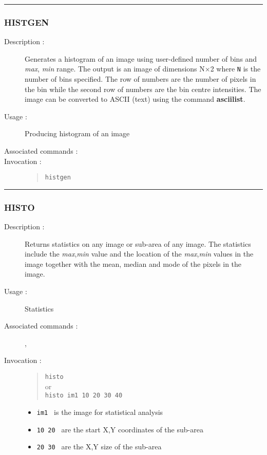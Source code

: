 \hrule 
\subsubsection*{\label{HISTGEN}HISTGEN}

\begin{description}

\item[Description :] Generates a histogram of an image using
user-defined number of bins and {\it max}, {\it min} range.  The output
is an image of dimensions N$\times$2 where {\tt N} is the number of bins
specified.  The row of numbers are the number of pixels in the bin
while the second row of numbers are the bin centre intensities.  The
image can be converted to ASCII (text) using the command {\bf asciilist}.

\item[Usage :] Producing histogram of an image
\item[Associated commands :] {\tt {}}
\item[Invocation :]

\begin{quote}{\tt  histgen }\end{quote}

\end{description}

\hrule 
\subsubsection*{\label{HISTO}HISTO}

\begin{description}

\item[Description :] Returns statistics on any image or sub-area of any
image.  The statistics include the {\it max},{\it min} value and the
location of the {\it max},{\it min} values in the image together with
the mean, median and mode of the pixels in the image.

\item[Usage :] Statistics

\item[Associated commands :] {\tt {}}, 
{\tt {}}

\item[Invocation :]

\begin{quote}{\tt  histo }\\
or \\
{\tt histo im1 10 20 30 40 }
\end{quote}

\begin{itemize}

\item {\tt im1 } is the image for statistical analysis
\item {\tt 10 20 } are the start X,Y coordinates of the sub-area
\item {\tt 20 30 } are the X,Y size of the sub-area
\end{itemize}\end{description}

